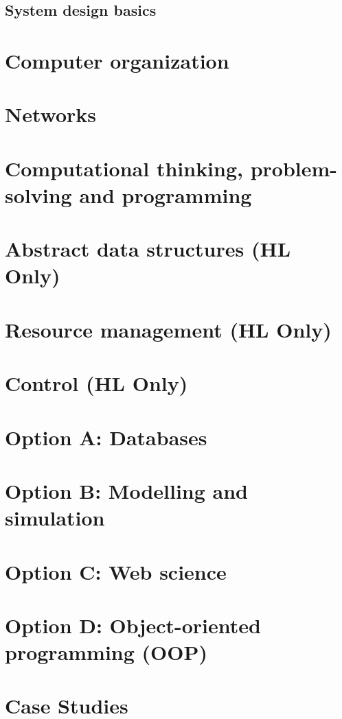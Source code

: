 \documentclass[12pt,a4paper]{article}
\begin{document}
\subsection{System design basics}

\section{Computer organization}
\section{Networks}

\section{Computational thinking, problem-solving and programming}

\section{Abstract data structures (HL Only)}

\section{Resource management (HL Only)}

\section{Control (HL Only)}

\section{Option A: Databases}

\section{Option B: Modelling and simulation}

\section{Option C: Web science}

\section{Option D: Object-oriented programming (OOP)}

\section{Case Studies}
\end{document}
